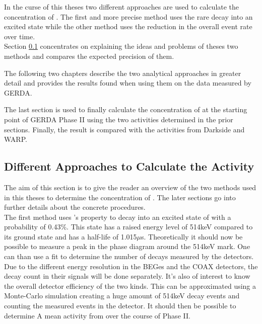 In the curse of this theses two different approaches are used to calculate the concentration of . 
The first and more precise method uses the rare  decay into an excited state while the other method uses the reduction in the overall event rate over time.\\

Section \ref{sec:Appro} concentrates on explaining the ideas and problems of theses two methods and compares the expected precision of them. 

The following two chapters describe the two analytical approaches in greater detail and provides the results found when using them on the data measured by GERDA.

The last section is used to finally calculate the concentration of  at the starting point of GERDA Phase II using the two activities determined in the prior sections. 
Finally, the result is compared with the activities from Darkside and WARP. 


\subsection{Different Approaches to Calculate the Activity}
\label{sec:Appro}

The aim of this section is to give the reader an overview of the two methods used in this theses to determine the concentration of . 
The later sections go into further details about the concrete procedures.
\\

The first method uses 's property to decay into an excited state of  with a probability of 0.43\%. 
This state has a raised energy level of 514keV compared to its ground state and has a half-life of 1.015\(\mu\)s. 
Theoretically it should now be possible to measure a peak in the phase diagram around the 514keV mark. 
One can than use a fit to determine the number of decays measured by the detectors. 
Due to the different energy resolution in the BEGes and the COAX detectors, the decay count in their signals will be done separately. 
It's also of interest to know the overall detector efficiency of the two kinds. 
This can be approximated using a Monte-Carlo simulation creating a huge amount of 514keV decay events and counting the measured events in the detector. 
It should then be possible to determine A mean activity from  over the course of Phase II.
\\


